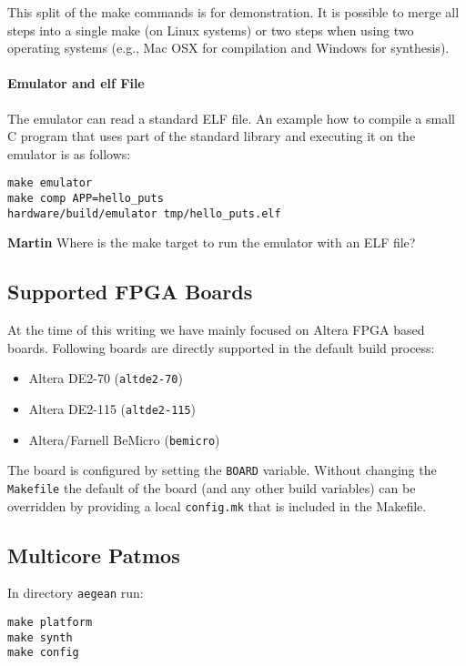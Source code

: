 \documentclass[a4paper,fontsize=10pt,twoside,DIV15,BCOR12mm,headinclude=true,footinclude=false,pagesize,bibtotoc]{scrbook}
\newcommand{\code}[1]{{\texttt{#1}}}
\newcommand{\comment}[3]{

\textsf{\textbf{#1}} {\color{#3}#2}}
\newcommand{\martin}[1]{\comment{Martin}{#1}{Blue}}
\begin{document}
This split of the make commands is for demonstration. It is
possible to merge all steps into a single make (on Linux
systems) or two steps when using two operating
systems (e.g., Mac OSX for compilation and Windows for synthesis).

\paragraph{Emulator and elf File}

The emulator can read a standard ELF file. An example how to compile
a small C program that uses part of the standard library and executing
it on the emulator is as follows:

\begin{verbatim}
make emulator
make comp APP=hello_puts
hardware/build/emulator tmp/hello_puts.elf
\end{verbatim}

\martin{Where is the make target to run the emulator with an ELF file?}

\subsection{Supported FPGA Boards}

At the time of this writing we have mainly focused on Altera FPGA based boards. Following boards
are directly supported in the default build process:

\begin{itemize}
\item Altera DE2-70 (\code{altde2-70})
\item Altera DE2-115 (\code{altde2-115})
\item Altera/Farnell BeMicro (\code{bemicro})
\end{itemize}

The board is configured by setting the \code{BOARD} variable.
Without changing the \code{Makefile} the default of the board (and any other build variables)
can be overridden by providing a local \code{config.mk} that is included in the Makefile.

\subsection{Multicore Patmos}

In directory \code{aegean} run:

\begin{verbatim}
make platform
make synth
make config
\end{verbatim}
\end{document}
